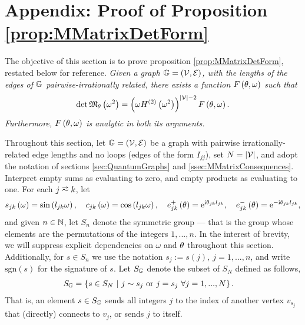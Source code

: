 \section{Appendix: Proof of Proposition \ref{prop:MMatrixDetForm}} \label{app:ProofOfProp}
The objective of this section is to prove proposition \ref{prop:MMatrixDetForm}, restated below for reference. \newline
\textit{ Given a graph $\mathbb{G} = \left( \mathcal{V}, \mathcal{E} \right)$, with the lengths of the edges of $\mathbb{G}$ pairwise-irrationally related, there exists a function $F\left( \theta,\omega \right)$ such that
\begin{align*}
	\det\mathfrak{M}_\theta\left( \omega^2 \right) = \left(  \omega H^{(2)}\left( \omega^2 \right)  \right)^{\left\lvert \mathcal{V} \right\rvert-2} F\left( \theta,\omega \right).
\end{align*}
Furthermore, $F\left( \theta,\omega \right)$ is analytic in both its arguments. } \newline

Throughout this section, let $\mathbb{G}=\left( \mathcal{V}, \mathcal{E} \right)$ be a graph with pairwise irrationally-related edge lengths and no loops (edges of the form $I_{jj}$), set $N=\left\lvert \mathcal{V} \right\rvert$, and adopt the notation of sections \ref{sec:QuantumGraphs} and \ref{ssec:MMatrixConsequences}.
Interpret empty sums as evaluating to zero, and empty products as evaluating to one.
For each $j\conLeft k$, let
\begin{align*}
	s_{jk}\left( \omega \right) = \sin\left( l_{jk}\omega \right), \quad
	c_{jk}\left( \omega \right) = \cos\left( l_{jk}\omega \right), \quad
	e_{jk}^+\left( \theta \right) = \mathrm{e}^{\mathrm{i}\theta_{jk}l_{jk}}, \quad
	e_{jk}^-\left( \theta \right) = \mathrm{e}^{-\mathrm{i}\theta_{jk}l_{jk}},
\end{align*}
and given $n\in\mathbb{N}$, let $S_n$ denote the symmetric group --- that is the group whose elements are the permutations of the integers $1, ..., n$.
In the interest of brevity, we will suppress explicit dependencies on $\omega$ and $\theta$ throughout this section.
Additionally, for $s\in S_n$ we use the notation $s_j := s(j), \ j=1,...,n$, and write $\mathrm{sgn}(s)$ for the signature of $s$.
Let $S_{\mathbb{G}}$ denote the subset of $S_N$ defined as follows,
\begin{align*}
	S_{\mathbb{G}} &= \left\{  s\in S_N \ \middle\vert \  j\sim s_j \text{ or } j=s_j \ \forall j=1,...,N \right\}.
\end{align*}
That is, an element $s\in S_{\mathbb{G}}$ sends all integers $j$ to the index of another vertex $v_{s_j}$ that (directly) connects to $v_j$, or sends $j$ to itself.

